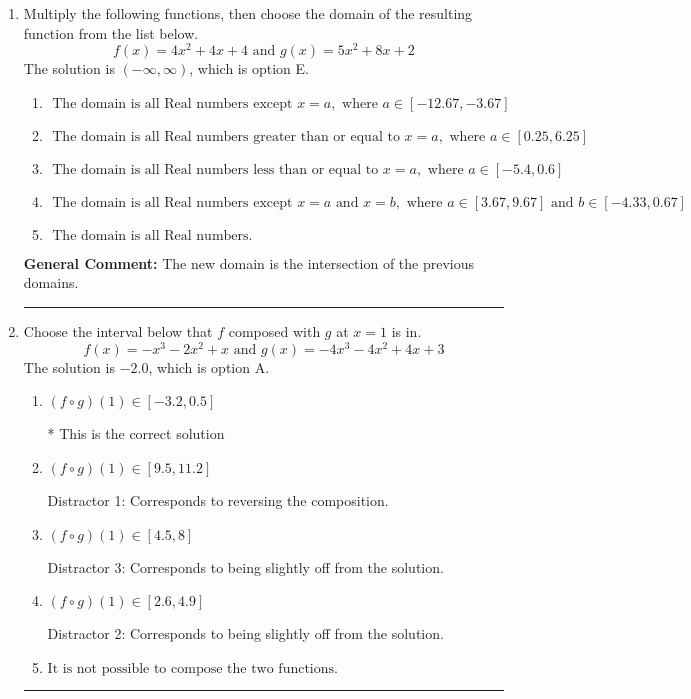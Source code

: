 \documentclass{extbook}[14pt]
\newcommand{\litem}[1]{\item #1

\rule{\textwidth}{0.4pt}}
\begin{document}
\begin{enumerate}\litem{
Multiply the following functions, then choose the domain of the resulting function from the list below.
\[ f(x) = 4x^{2} +4 x + 4 \text{ and } g(x) = 5x^{2} +8 x + 2 \]The solution is \( (-\infty, \infty) \), which is option E.\begin{enumerate}[label=\Alph*.]
\item \( \text{ The domain is all Real numbers except } x = a, \text{ where } a \in [-12.67, -3.67] \)


\item \( \text{ The domain is all Real numbers greater than or equal to } x = a, \text{ where } a \in [0.25, 6.25] \)


\item \( \text{ The domain is all Real numbers less than or equal to } x = a, \text{ where } a \in [-5.4, 0.6] \)


\item \( \text{ The domain is all Real numbers except } x = a \text{ and } x = b, \text{ where } a \in [3.67, 9.67] \text{ and } b \in [-4.33, 0.67] \)


\item \( \text{ The domain is all Real numbers. } \)


\end{enumerate}

\textbf{General Comment:} The new domain is the intersection of the previous domains.
}
\litem{
Choose the interval below that $f$ composed with $g$ at $x=1$ is in.
\[ f(x) = -x^{3} -2 x^{2} +x \text{ and } g(x) = -4x^{3} -4 x^{2} +4 x + 3 \]The solution is \( -2.0 \), which is option A.\begin{enumerate}[label=\Alph*.]
\item \( (f \circ g)(1) \in [-3.2, 0.5] \)

* This is the correct solution
\item \( (f \circ g)(1) \in [9.5, 11.2] \)

 Distractor 1: Corresponds to reversing the composition.
\item \( (f \circ g)(1) \in [4.5, 8] \)

 Distractor 3: Corresponds to being slightly off from the solution.
\item \( (f \circ g)(1) \in [2.6, 4.9] \)

 Distractor 2: Corresponds to being slightly off from the solution.
\item \( \text{It is not possible to compose the two functions.} \)



\end{enumerate}}
\end{enumerate}
\end{document}
